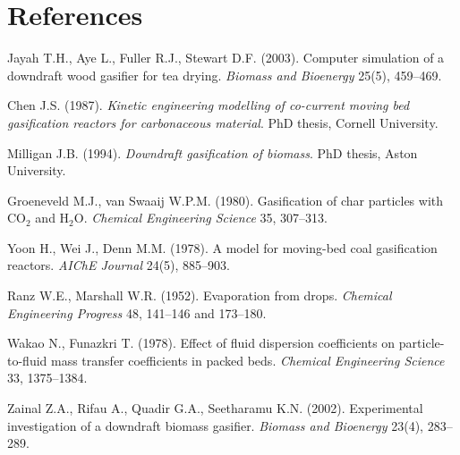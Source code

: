 \documentclass[11pt,a4paper]{article}
\begin{document}
\section*{References}
\begin{enumerate}[label={[\arabic*]},leftmargin=*]
\item Jayah T.H., Aye L., Fuller R.J., Stewart D.F. (2003). Computer simulation of a downdraft wood gasifier for tea drying. \emph{Biomass and Bioenergy} 25(5), 459--469.
\item Chen J.S. (1987). \emph{Kinetic engineering modelling of co-current moving bed gasification reactors for carbonaceous material}. PhD thesis, Cornell University.
\item Milligan J.B. (1994). \emph{Downdraft gasification of biomass}. PhD thesis, Aston University.
\item Groeneveld M.J., van Swaaij W.P.M. (1980). Gasification of char particles with CO$_2$ and H$_2$O. \emph{Chemical Engineering Science} 35, 307--313.
\item Yoon H., Wei J., Denn M.M. (1978). A model for moving-bed coal gasification reactors. \emph{AIChE Journal} 24(5), 885--903.
\item Ranz W.E., Marshall W.R. (1952). Evaporation from drops. \emph{Chemical Engineering Progress} 48, 141--146 and 173--180.
\item Wakao N., Funazkri T. (1978). Effect of fluid dispersion coefficients on particle-to-fluid mass transfer coefficients in packed beds. \emph{Chemical Engineering Science} 33, 1375--1384.
\item Zainal Z.A., Rifau A., Quadir G.A., Seetharamu K.N. (2002). Experimental investigation of a downdraft biomass gasifier. \emph{Biomass and Bioenergy} 23(4), 283--289.
\end{enumerate}

\appendix
\end{document}
